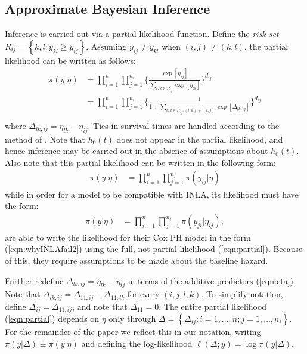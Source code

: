\documentclass[ba]{imsart}
\begin{document}
\subsection{Approximate Bayesian Inference}

Inference is carried out via a partial likelihood function. Define the \textit{risk set} $R_{ij} = \left\{k,l : y_{kl} \geq y_{ij}\right\}$. Assuming $y_{ij} \neq y_{kl}$ when $(i,j) \neq (k,l)$, the partial likelihood can be written as follows: 
\begin{equation}\begin{aligned}\label{eqn:partial}
\pi(y|\eta) &= \prod_{i=1}^{n}\prod_{j=1}^{n_{i}} \bigg\{\frac{\exp[\eta_{ij}]}{{\sum_{l,k\in R_{ij}}^{}\exp[\eta_{lk}]}}\bigg \}^{d_{ij}} \\
&= \prod_{i=1}^{n}\prod_{j=1}^{n_{i}} \bigg\{\frac{1}{{1 + \sum_{l,k\in R_{ij} , (l,k) \neq (i,j)}\exp[\Delta_{lk,ij}]}}\bigg \}^{d_{ij}} \\
\end{aligned}\end{equation}
where $\Delta_{lk,ij} = \eta_{lk} - \eta_{ij}$. Ties in survival times are handled according to the method of \cite{Breslow}. Note that $h_{0}(t)$ does not appear in the partial likelihood, and hence inference may be carried out in the absence of assumptions about $h_{0}(t)$. Also note that this partial likelihood can be written in the following form:
\begin{equation}\begin{aligned}\label{eqn:whyINLAfail1}
\pi(y|\eta) &= \prod_{i=1}^{n}\prod_{j=1}^{n_{i}} \pi(y_{ij}|\eta)
\end{aligned}\end{equation}
while in order for a model to be compatible with INLA, its likelihood must have the form:
\begin{equation}\begin{aligned}\label{eqn:whyINLAfail2}
\pi(y|\eta) &= \prod_{i=1}^{n}\prod_{j=1}^{n_{i}} \pi(y_{ji}|\eta_{ij}),
\end{aligned}\end{equation}
\cite{inlacoxph} are able to write the likelihood for their Cox PH model in the form (\ref{eqn:whyINLAfail2}) using the full, not partial likelihood (\ref{eqn:partial}). Because of this, they require assumptions to be made about the baseline hazard.

Further redefine $\Delta_{lk,ij} = \eta_{lk} - \eta_{ij}$ in terms of the additive predictors (\ref{eqn:eta}). Note that $\Delta_{lk,ij} = \Delta_{11,ij} - \Delta_{11,lk}$ for every $(i,j,l,k)$. To simplify notation, define $\Delta_{ij} = \Delta_{11,ij}$, and note that $\Delta_{11} = 0$. The entire partial likelihood (\ref{eqn:partial}) depends on $\eta$ only through  $\Delta = \left\{\Delta_{ij}: i = 1,\ldots,n; j = 1,\ldots,n_{i} \right\}$. For the remainder of the paper we reflect this in our notation, writing $\pi(y|\Delta) \equiv \pi(y|\eta)$ and defining the log-likelihood $\ell(\Delta; y) = \log\pi(y|\Delta)$.
\end{document}
